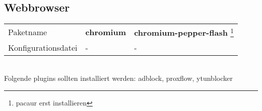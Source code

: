 \subsection{Webbrowser}
\begin{tabular}{l|l|l}
Paketname & \textbf{chromium} & \textbf{chromium-pepper-flash} \footnote{pacaur erst installieren} \\ 
Konfigurationsdatei & - & - \\
\end{tabular}
\\
Folgende plugins sollten installiert werden: adblock, proxflow, ytunblocker
